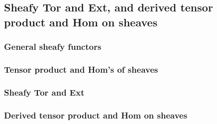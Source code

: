 


\subsection{Sheafy Tor and Ext, and derived tensor product and Hom on sheaves}

\subsubsection{General sheafy functors}
\TODO{}





\subsubsection{Tensor product and Hom's of sheaves }







\subsubsection{Sheafy Tor and Ext}

\TODO{}


\subsubsection{Derived tensor product and Hom on sheaves}

